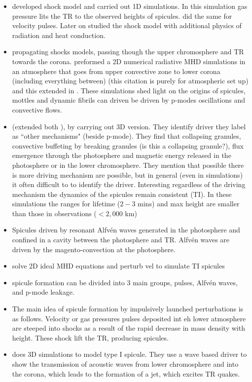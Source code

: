 \documentclass[12pt]{ociamthesis}
\newcommand{\Alfven}{Alfv\'{e}n }
\begin{document}
\begin{itemize}
         \item \cite{Hollweg1982ApJ257345H} developed shock model and carried out 1D simulations. In this simulation gas pressure lits the TR to the observed heights of spicules. \cite{Suematsu1982SoPh7599S} did the same for velocity pulses. Later on \cite{Heggland2007ApJ6661277H} studied the shock model with additional physics of radiation and heat conduction.
    \item  propagating shocks models, passing though the upper chromosphere and TR towards the corona. \cite{Hansteen2006ApJ} preformed a 2D numerical radiative MHD simulations in an atmosphere that goes from upper convective zone to lower corona (including everything between) \cite{Hansteen2007ASPC368107H} (this citation is purely for atmospheric set up) and this extended in \cite{De_Pontieu2007ApJ}. These simulations shed light on the origins of spicules, mottles and dynamic fibrils can driven be driven by p-modes oscillations and convective flows.
    \item \cite{Mart2009ApJ7011569M} (extended both \citep{De_Pontieu2007ApJ,Hansteen2006ApJ}), by carrying out 3D version. They identify driver they label as ``other mechanisms" (beside p-mode). They find that collapsing granules, convective buffeting by breaking granules (is this a collapsing granule?), flux emergence through the photosphere and magnetic energy released in the photosphere or in the lower chromosphere. They mention that possible there is more driving mechanism are possible, but in general (even in simulations) it often difficult to to identify the driver. Interesting regardless of the driving mechanism the dynamics of the spicules remain consistent (TI). In these simulations the ranges for lifetime ($2-3$ mins) and max height are smaller than those in observations ($<2,000$ km)  
    \item \cite{Matsumoto2010ApJ7101857M}  Spicules driven by resonant \Alfven waves generated in the photosphere and confined in a cavity between the photosphere and TR. \Alfven waves are driven by the magento-convection at the photosphere. 
    \item solve 2D ideal MHD equations and perturb vel to simulate TI spicules \cite{Murawski2010AA519A8M} 
    \item \cite{Murawski2010AA519A8M} spicule formation can be divided into 3 main groups, pulses, \Alfven waves, and p-mode leakage. 
    \item The main idea of spicule formation by impulsively launched perturbations is as follows. Velocity or gas pressures pulses deposited int eh lower atmosphere are steeped into shocks as a result of the rapid decrease in mass density with height. These shock lift the TR, producing spicules.

    \item \cite{Scullion2011ApJ74314S} does 3D simulations to model type I spicule. They use a wave based driver to show the transmission of acoustic waves from lower chromosphere and into the corona, which leads to the formation of a jet, which excites TR quakes.
\end{itemize}
\end{document}
